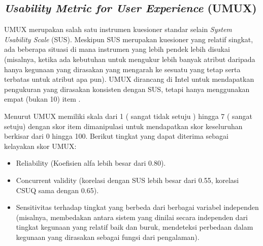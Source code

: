 \subsection{\textit{Usability Metric for User Experience} (UMUX)}
UMUX merupakan salah satu instrumen kuesioner standar selain \textit{System Usability Scale} (SUS). Meskipun SUS merupakan kuesioner yang relatif singkat, ada beberapa situasi di mana instrumen yang lebih pendek lebih disukai (misalnya, ketika ada kebutuhan untuk mengukur lebih banyak atribut daripada hanya kegunaan yang dirasakan yang mengarah ke sesuatu yang tetap serta terbatas untuk atribut apa pun). UMUX dirancang di Intel untuk mendapatkan pengukuran yang dirasakan konsisten dengan SUS, tetapi hanya menggunakan empat (bukan 10) item \citep{lewis2018measuring}.

\begin{table}[H]
\caption{Daftar Pertanyaan Metode UMUX menurut \citep{lewis2018measuring}.}
\label{tab:UMUX}
\end{table}

\par Menurut \citep{lewis2018measuring} UMUX memiliki skala dari 1 ( sangat tidak setuju ) hingga 7 ( sangat setuju) dengan skor item dimanipulasi untuk mendapatkan skor keseluruhan berkisar dari 0 hingga 100. Berikut tingkat yang dapat diterima sebagai kelayakan skor UMUX:

\begin{itemize}
\item Reliability (Koefisien alfa lebih besar dari 0.80).

\item Concurrent validity (korelasi dengan SUS lebih besar dari 0.55, korelasi CSUQ sama dengan 0.65).

\item Sensitivitas terhadap tingkat yang berbeda dari berbagai variabel independen (misalnya, membedakan antara sistem yang dinilai secara independen dari tingkat kegunaan yang relatif baik dan buruk, mendeteksi perbedaan dalam kegunaan yang dirasakan sebagai fungsi dari pengalaman).

\end{itemize}

